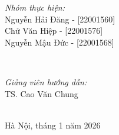 \begin{titlepage}
\begin{minipage}{0.4\textwidth}
\begin{flushleft} \large
\emph{Nhóm thực hiện:} \\
Nguyễn Hải Đăng - [22001560]\\ 
Chử Văn Hiệp - [22001576]\\
Nguyễn Mậu Đức - [22001568]
\end{flushleft}
\end{minipage}
~
\begin{minipage}{0.4\textwidth}
\begin{flushright} \large
\emph{Giảng viên hướng dẫn:} \\
TS. Cao Văn Chung
\end{flushright}
\end{minipage}\\[0.5cm]

\vfill
{\large Hà Nội, tháng 1 năm 2026}

\end{titlepage}
